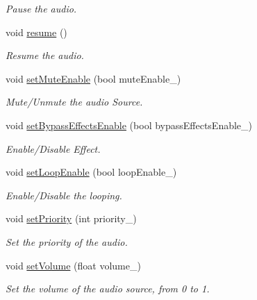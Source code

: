 \begin{DoxyCompactItemize}
\begin{DoxyCompactList}\small\item\em Pause the audio. \end{DoxyCompactList}\item 
void \hyperlink{class_magnum_1_1_audio_source_base_aee8840f1895eb802d25cc6b494ce9891}{resume} ()\hypertarget{class_magnum_1_1_audio_source_base_aee8840f1895eb802d25cc6b494ce9891}{}\label{class_magnum_1_1_audio_source_base_aee8840f1895eb802d25cc6b494ce9891}

\begin{DoxyCompactList}\small\item\em Resume the audio. \end{DoxyCompactList}\item 
void \hyperlink{class_magnum_1_1_audio_source_base_a5fbb95d5277c3a5e4eb73fb0d7a0edf5}{set\+Mute\+Enable} (bool mute\+Enable\+\_\+)
\begin{DoxyCompactList}\small\item\em Mute/\+Unmute the audio Source. \end{DoxyCompactList}\item 
void \hyperlink{class_magnum_1_1_audio_source_base_a27f6acecda8f7960b3c79b99e8473ce8}{set\+Bypass\+Effects\+Enable} (bool bypass\+Effects\+Enable\+\_\+)
\begin{DoxyCompactList}\small\item\em Enable/\+Disable Effect. \end{DoxyCompactList}\item 
void \hyperlink{class_magnum_1_1_audio_source_base_a223d20c8d7d0147479775e38f08872a6}{set\+Loop\+Enable} (bool loop\+Enable\+\_\+)
\begin{DoxyCompactList}\small\item\em Enable/\+Disable the looping. \end{DoxyCompactList}\item 
void \hyperlink{class_magnum_1_1_audio_source_base_a5030b2f2e0d0000d9a640f17801514c7}{set\+Priority} (int priority\+\_\+)
\begin{DoxyCompactList}\small\item\em Set the priority of the audio. \end{DoxyCompactList}\item 
void \hyperlink{class_magnum_1_1_audio_source_base_a0115bbd05b13cc7b53a4561adf532782}{set\+Volume} (float volume\+\_\+)
\begin{DoxyCompactList}\small\item\em Set the volume of the audio source, from 0 to 1. \end{DoxyCompactList}\item 

\end{DoxyCompactItemize}

